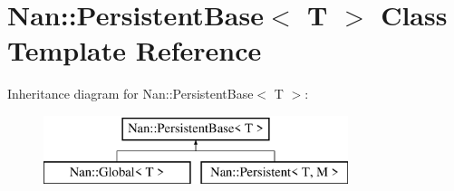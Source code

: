 \hypertarget{class_nan_1_1_persistent_base}{}\section{Nan\+:\+:Persistent\+Base$<$ T $>$ Class Template Reference}
\label{class_nan_1_1_persistent_base}
Inheritance diagram for Nan\+:\+:Persistent\+Base$<$ T $>$\+:\begin{figure}[H]
\begin{center}
\leavevmode
\includegraphics[height=2.000000cm]{class_nan_1_1_persistent_base}
\end{center}
\end{figure}

